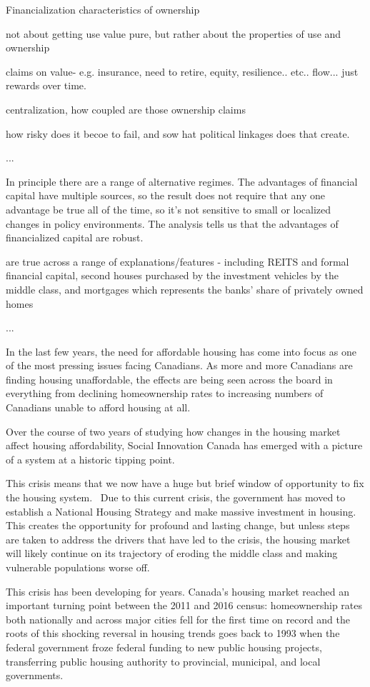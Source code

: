 Financialization
characteristics of ownership

not about getting use value pure, but rather about the properties of use and ownership

claims on value- e.g. insurance, need to retire, equity, resilience.. etc.. flow... just rewards over time.

centralization, 
how coupled are those ownership claims

how risky does it becoe to fail, and sow hat political linkages does that create. 


...

In principle there are a range of alternative regimes.
The advantages of financial capital have multiple sources, so the result does not require that any one advantage be true all of the time, so it's not sensitive to small or localized changes in policy environments. The analysis tells us that the advantages of financialized capital are robust.

are true across a range of explanations/features - including REITS and formal financial capital, second houses purchased by the investment vehicles by the middle class, and mortgages which represents the banks' share of privately owned homes

...


In the last few years, the need for affordable housing has come into focus as one of the most pressing issues facing Canadians. As more and more Canadians are finding housing unaffordable, the effects are being seen across the board in everything from declining homeownership rates to increasing numbers of Canadians unable to afford housing at all.

Over the course of two years of studying how changes in the housing market affect housing affordability, Social Innovation Canada has emerged with a picture of a system at a historic tipping point. 

This crisis means that we now have a huge but brief window of opportunity to fix the housing system.  Due to this current crisis, the government has moved to establish a National Housing Strategy and make massive investment in housing. This creates the opportunity for profound and lasting change, but unless steps are taken to address the drivers that have led to the crisis, the housing market will likely continue on its trajectory of eroding the middle class and making vulnerable populations worse off.   

This crisis has been developing for years. Canada's housing market reached an important turning point between the 2011 and 2016 census: homeownership rates both nationally and across major cities fell for the first time on record and the roots of this shocking reversal in housing trends goes back to 1993 when the federal government froze federal funding to new public housing projects, transferring public housing authority to provincial, municipal, and local governments. 

